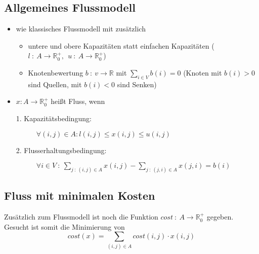 \subsection{Allgemeines Flussmodell}
\begin{itemize}
	\item wie klassisches Flussmodell mit zusätzlich
		\begin{itemize}
			\item untere und obere Kapazitäten statt einfachen Kapazitäten ($l~:~A\rightarrow\mathbb{R}_0^{+},~~u~:~A\rightarrow\mathbb{R}_0^{+}$)
			\item Knotenbewertung $b~:~v\rightarrow\mathbb{R}$ mit $\sum\limits_{i\in V}b(i)=0$ (Knoten mit $b(i)>0$ sind Quellen, mit $b(i)<0$ sind Senken)
		\end{itemize}
	\item $x:A\rightarrow\mathbb{R}_0^{+}$ heißt Fluss, wenn
		\begin{description}
			\item[1. Kapazitätsbedingung:] $\forall (i,j)\in A : l(i,j)\leq x(i,j)\leq u(i,j)$
			\item[2. Flusserhaltungsbedingung:] $\forall i\in V~:~\sum\limits_{j~:~(i,j)\in A} x(i,j)-\sum\limits_{j~:~(j,i)\in A} x(j,i)=b(i)$
		\end{description}
\end{itemize}
\topbreak
\vspace*{-2\baselineskip}
\subsection{Fluss mit minimalen Kosten}
Zusätzlich zum Flussmodell ist noch die Funktion $cost~:~A\rightarrow\mathbb{R}_0^{+}$ gegeben.\\
Gesucht ist somit die Minimierung von
\[cost(x)=\sum\limits_{(i,j)\in A}cost(i,j)\cdot x(i,j)\]
